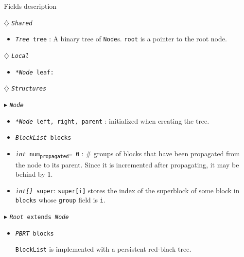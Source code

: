 \documentclass[10pt]{article}
\newcommand{\sub}[1]{\textsubscript{#1}}
\renewcommand{\tt}[1]{\texttt{#1}}
\renewcommand{\sl}[1]{\textsl{#1}}
\renewcommand{\bf}[1]{\textbf{#1}}
\theoremstyle{definition}
\begin{document}
\begin{algorithm}
\caption{Fields description}
\begin{algorithmic}[1]
\setcounter{ALG@line}{100}
\begin{multicols}{2}


\Statex $\diamondsuit$ \tt{\sl{Shared}}
\begin{itemize}
\item \tt{\sl{Tree} tree} \textsf{: A binary tree of \tt{Node}s. \tt{root} is a pointer to the root node.}
\end{itemize}

\Statex

\Statex $\diamondsuit$ \tt{\sl{Local}}
\begin{itemize}
\item \tt{\sl{*Node} leaf:} 
\end{itemize}

\Statex
\Statex $\diamondsuit$ \tt{\sl{Structures}}

\Statex $\blacktriangleright$ \tt{\sl{Node}}
\begin{itemize}
\item \tt{\sl{*Node} left, right, parent} \textsf{: initialized  when creating the tree.}
\item \tt{\sl{BlockList} blocks}
\item \tt{\sl{int} num\sub{propagated}= 0}\textsf{} \textsf{: \# groups of blocks that have been propagated from the node to its parent. Since it is incremented after propagating, it may be behind by 1.}
\item \tt{\sl{int[]} super}\textsf{: \tt{super[i]} stores the index of the superblock of some block in \tt{blocks} whose \tt{group} field is \tt{i}.}
\end{itemize}

\Statex $\blacktriangleright$ \tt{\sl{Root} extends \sl{Node}}
\begin{itemize}
  
\item \tt{\sl{PBRT} blocks}

  \textsf{\tt{BlockList} is implemented with a persistent red-black tree.}
  
\end{itemize}


\end{multicols}
\end{algorithmic}
\end{algorithm}
\end{document}
